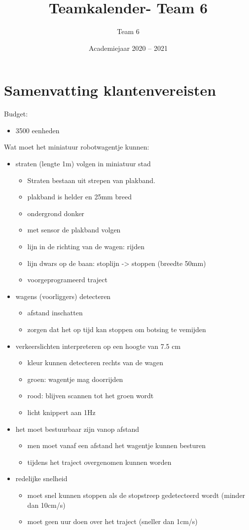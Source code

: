 \documentclass{article}
\date{Academiejaar 2020 -- 2021}
\title{Teamkalender- Team 6}
\author{Team 6}
\begin{document}
	
\section{Samenvatting klantenvereisten}
Budget:
\begin{itemize}
	\item 3500 eenheden
\end{itemize}

Wat moet het miniatuur robotwagentje kunnen:

\begin{itemize}
	\item straten (lengte 1m) volgen in miniatuur stad
	\begin{itemize}
		\item Straten bestaan uit strepen van plakband.
		\item plakband is helder en 25mm breed
		\item ondergrond donker
		\item met sensor de plakband volgen
		\item lijn in de richting van de wagen: rijden
		\item lijn dwars op de baan: stoplijn -> stoppen (breedte 50mm)
		\item voorgeprogrameerd traject
	\end{itemize}
	\item wagens (voorliggers) detecteren
	\begin{itemize}
		\item afstand inschatten
		\item zorgen dat het op tijd kan stoppen om botsing te vemijden
	\end{itemize}
	\item verkeerslichten interpreteren op een hoogte van 7.5 cm
	\begin{itemize}
		\item kleur kunnen detecteren rechts van de wagen
		\item groen: wagentje mag doorrijden
		\item rood: blijven scannen tot het groen wordt
		\item licht knippert aan 1Hz
	\end{itemize}
	\item het moet bestuurbaar zijn vanop afstand
	\begin{itemize}
		\item men moet vanaf een afstand het wagentje kunnen besturen
		\item tijdens het traject overgenomen kunnen worden
	\end{itemize}
	\item redelijke snelheid
	\begin{itemize}
		\item moet snel kunnen stoppen als de stopstreep gedetecteerd wordt (minder dan 10cm/s)
		\item moet geen uur doen over het traject (sneller dan 1cm/s)
	\end{itemize}

\end{itemize}
\end{document}
